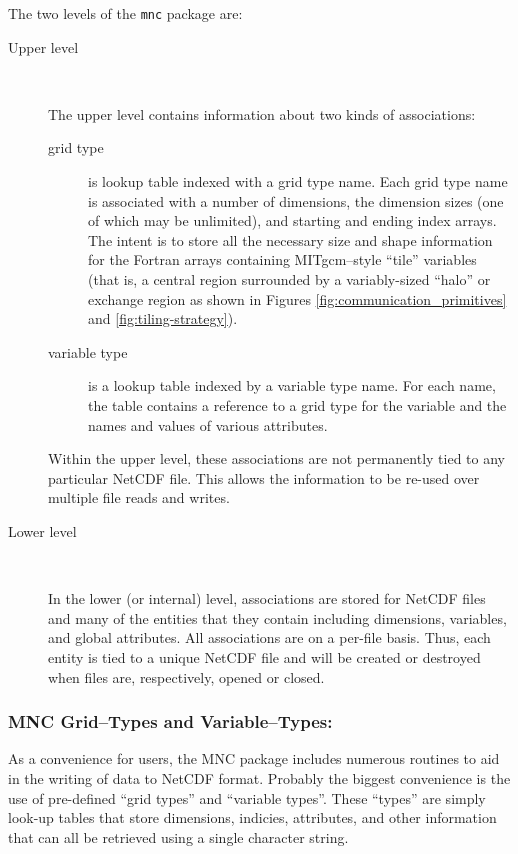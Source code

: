 The two levels of the \texttt{mnc} package are:
\begin{description}

\item[Upper level] \ 
  
  The upper level contains information about two kinds of
  associations:
  \begin{description}
  \item[grid type] is lookup table indexed with a grid type name.
    Each grid type name is associated with a number of dimensions, the
    dimension sizes (one of which may be unlimited), and starting and
    ending index arrays.  The intent is to store all the necessary
    size and shape information for the Fortran arrays containing
    MITgcm--style ``tile'' variables (that is, a central region
    surrounded by a variably-sized ``halo'' or exchange region as
    shown in Figures \ref{fig:communication_primitives} and
    \ref{fig:tiling-strategy}).
  
  \item[variable type] is a lookup table indexed by a variable type
    name.  For each name, the table contains a reference to a grid
    type for the variable and the names and values of various
    attributes.
  \end{description}
  
  Within the upper level, these associations are not permanently tied
  to any particular NetCDF file.  This allows the information to be
  re-used over multiple file reads and writes.

\item[Lower level] \ 
  
  In the lower (or internal) level, associations are stored for NetCDF
  files and many of the entities that they contain including
  dimensions, variables, and global attributes.  All associations are
  on a per-file basis.  Thus, each entity is tied to a unique NetCDF
  file and will be created or destroyed when files are, respectively,
  opened or closed.

\end{description}


\subsubsection{MNC Grid--Types and Variable--Types:}

As a convenience for users, the MNC package includes numerous routines
to aid in the writing of data to NetCDF format.  Probably the biggest
convenience is the use of pre-defined ``grid types'' and ``variable
types''.  These ``types'' are simply look-up tables that store
dimensions, indicies, attributes, and other information that can all
be retrieved using a single character string.

